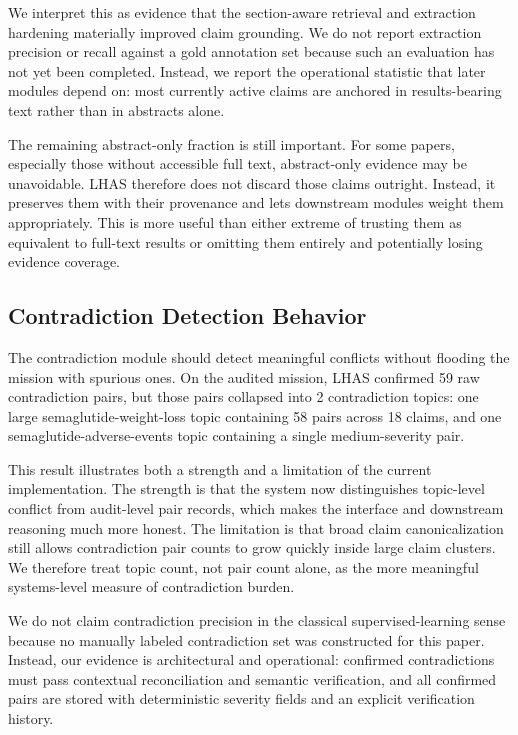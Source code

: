 \documentclass[manuscript,screen,review]{jair}
\begin{document}
We interpret this as evidence that the section-aware retrieval and extraction hardening materially improved claim grounding. We do not report extraction precision or recall against a gold annotation set because such an evaluation has not yet been completed. Instead, we report the operational statistic that later modules depend on: most currently active claims are anchored in results-bearing text rather than in abstracts alone.

The remaining abstract-only fraction is still important. For some papers, especially those without accessible full text, abstract-only evidence may be unavoidable. LHAS therefore does not discard those claims outright. Instead, it preserves them with their provenance and lets downstream modules weight them appropriately. This is more useful than either extreme of trusting them as equivalent to full-text results or omitting them entirely and potentially losing evidence coverage.

\subsection{Contradiction Detection Behavior}
The contradiction module should detect meaningful conflicts without flooding the mission with spurious ones. On the audited mission, LHAS confirmed 59 raw contradiction pairs, but those pairs collapsed into 2 contradiction topics: one large semaglutide-weight-loss topic containing 58 pairs across 18 claims, and one semaglutide-adverse-events topic containing a single medium-severity pair.

This result illustrates both a strength and a limitation of the current implementation. The strength is that the system now distinguishes topic-level conflict from audit-level pair records, which makes the interface and downstream reasoning much more honest. The limitation is that broad claim canonicalization still allows contradiction pair counts to grow quickly inside large claim clusters. We therefore treat topic count, not pair count alone, as the more meaningful systems-level measure of contradiction burden.

We do not claim contradiction precision in the classical supervised-learning sense because no manually labeled contradiction set was constructed for this paper. Instead, our evidence is architectural and operational: confirmed contradictions must pass contextual reconciliation and semantic verification, and all confirmed pairs are stored with deterministic severity fields and an explicit verification history.
\end{document}
